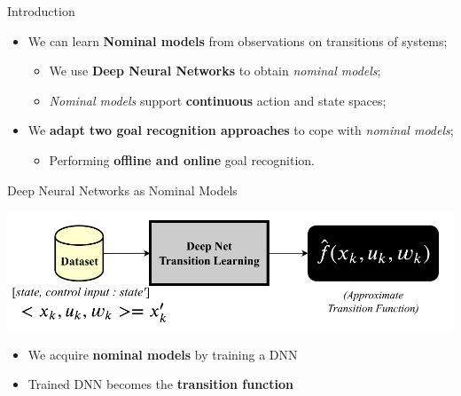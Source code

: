 \documentclass[usenames,dvipsnames]{beamer}
\begin{document}
    \begin{frame}{Introduction}
       	\begin{itemize}
			\vspace{3mm}
			\item We can learn \textbf{Nominal models} from observations on transitions of systems; 
				\begin{itemize}
					\vspace{1.5mm}
					\item We use \textbf{Deep Neural Networks} to obtain \textit{nominal models};
					\vspace{1.5mm}
					\item \textit{Nominal models} support \textbf{continuous} action and state spaces;
				\end{itemize}	
			
			\vspace{3mm}
			\item We \textbf{adapt two goal recognition approaches} to cope with \textit{nominal models};
			\begin{itemize}
				\item Performing \textbf{offline and online} goal recognition.
			\end{itemize}
		\end{itemize}
    \end{frame}
	
	
    \begin{frame}[c]{Deep Neural Networks as Nominal Models}
		\begin{center}
			\includegraphics[width=0.95\linewidth]{fig/DNNs_as_NominalModels.pdf}
		\end{center}
%
		
			\begin{itemize}
				\item We acquire \textbf{nominal models} by training a DNN
				\item Trained DNN becomes the \textbf{transition function}
			\end{itemize}		
    \end{frame}
	
\end{document}
